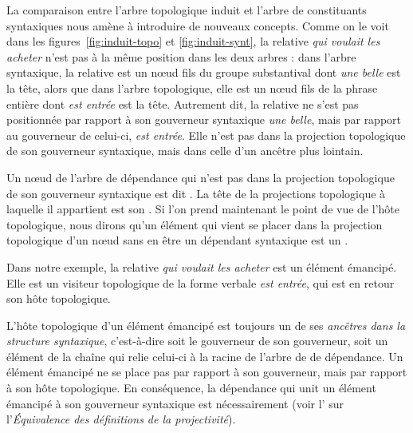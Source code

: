 La comparaison entre l’arbre topologique induit et l’arbre de constituants syntaxiques nous amène à introduire de nouveaux concepts. 
Comme on le voit dans les figures~\ref{fig:induit-topo} et \ref{fig:induit-synt}, la relative \textit{qui voulait les acheter} n’est pas à la même position dans les deux arbres : dans l’arbre syntaxique, la relative est un nœud fils du groupe substantival dont \textit{une belle} est la tête, alors que dans l’arbre topologique, elle est un nœud fils de la phrase entière dont \textit{est entrée} est la tête. Autrement dit, la relative ne s’est pas positionnée par rapport à son gouverneur syntaxique \textit{une belle}, mais par rapport au gouverneur de celui-ci, \textit{est entrée}. Elle n'est pas dans la projection topologique de son gouverneur syntaxique, mais dans celle d'un ancêtre plus lointain.

{Un nœud de l'arbre de dépendance qui n'est pas dans la projection topologique de son gouverneur syntaxique est dit . La tête de la projections topologique à laquelle il appartient est son . Si l’on prend maintenant le point de vue de l’hôte topologique, nous dirons qu’un élément qui vient se placer dans la projection topologique d'un nœud sans en être un dépendant syntaxique est un .}

Dans notre exemple, la relative \textit{qui voulait les acheter} est un élément émancipé. Elle est un visiteur topologique de la forme verbale \textit{est entrée}, qui est en retour son hôte topologique. 

L'hôte topologique d'un élément émancipé est toujours un de ses \textit{ancêtres dans la structure syntaxique}, c'est-à-dire soit le gouverneur de son gouverneur, soit
un élément de la chaîne qui relie celui-ci à la racine de l'arbre de de dépendance.
Un élément émancipé ne se place pas par rapport à son gouverneur, mais par rapport à son hôte topologique. 
En conséquence, la dépendance qui unit un élément émancipé à son gouverneur syntaxique est nécessairement  (voir l’ sur l’\textit{Équivalence des définitions de la projectivité}).

